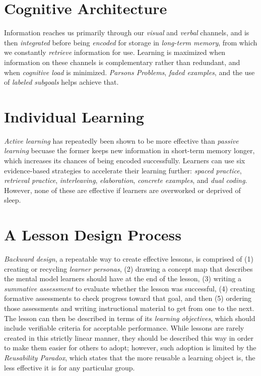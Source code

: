 \documentclass{article}
\begin{document}
\section{Cognitive Architecture}

Information reaches us primarily through our \emph{visual} and \emph{verbal} channels,
and is then \emph{integrated} before being \emph{encoded} for storage in \emph{long-term memory},
from which we constantly \emph{retrieve} information for use.
Learning is maximized when information on these channels is complementary rather than redundant,
and when \emph{cognitive load} is minimized.
\emph{Parsons Problems},
\emph{faded examples},
and the use of \emph{labeled subgoals} helps achieve that.

\section{Individual Learning}

\emph{Active learning} has repeatedly been shown to be more effective than \emph{passive learning}
becuase the former keeps new information in short-term memory longer,
which increases its chances of being encoded successfully.
Learners can use six evidence-based strategies to accelerate their learning further:
\emph{spaced practice},
\emph{retrieval practice},
\emph{interleaving},
\emph{elaboration},
\emph{concrete examples},
and \emph{dual coding}.
However,
none of these are effective if learners are overworked or deprived of sleep.

\section{A Lesson Design Process}

\emph{Backward design},
a repeatable way to create effective lessons,
is comprised of (1) creating or recycling \emph{learner personas},
(2) drawing a concept map that describes the mental model learners should have at the end of the lesson,
(3) writing a \emph{summative assessment} to evaluate whether the lesson was successful,
(4) creating formative assessments to check progress toward that goal,
and then (5) ordering those assessments and writing instructional material to get from one to the next.
The lesson can then be described in terms of its \emph{learning objectives},
which should include verifiable criteria for acceptable performance.
While lessons are rarely created in this strictly linear manner,
they should be described this way in order to make them easier for others to adopt;
however,
such adoption is limited by the \emph{Reusability Paradox},
which states that the more reusable a learning object is,
the less effective it is for any particular group.
\end{document}
